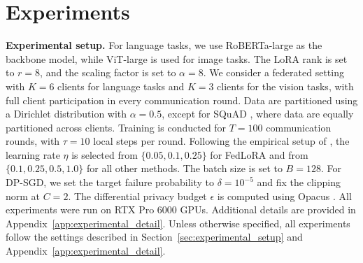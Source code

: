 \vspace{-3mm}

\section{Experiments}


\textbf{Experimental setup.} \label{sec:experimental_setup}
For language tasks, we use RoBERTa-large \cite{liu2019roberta} as the backbone model, while ViT-large \cite{dosovitskiy2020image} is used for image tasks. 
The LoRA rank is set to $r=8$, and the scaling factor is set to $\alpha=8$. 
We consider a federated setting with $K=6$ clients for language tasks and $K=3$ clients for the vision tasks, with full client participation in every communication round.
Data are partitioned using a Dirichlet distribution with $\alpha=0.5$, except for SQuAD \cite{rajpurkar2016squad, rajpurkar2018know}, where data are equally partitioned across clients.
Training is conducted for $T=100$ communication rounds, with $\tau=10$ local steps per round. 
Following the empirical setup of \cite{sun2024improving}, the learning rate $\eta$ is selected from $\{0.05, 0.1, 0.25\}$ for FedLoRA and from $\{0.1, 0.25, 0.5, 1.0\}$ for all other methods. 
The batch size is set to $B=128$. 
For DP-SGD, we set the target failure probability to $\delta = 10^{-5}$ and fix the clipping norm at $C=2$. 
The differential privacy budget $\epsilon$ is computed using Opacus 
\cite{yousefpour2021opacus}. All experiments were run on RTX Pro $6000$ GPUs. Additional details are provided in Appendix~\ref{app:experimental_detail}. Unless otherwise specified, all experiments follow the settings described 
in Section~\ref{sec:experimental_setup} and Appendix~\ref{app:experimental_detail}.



